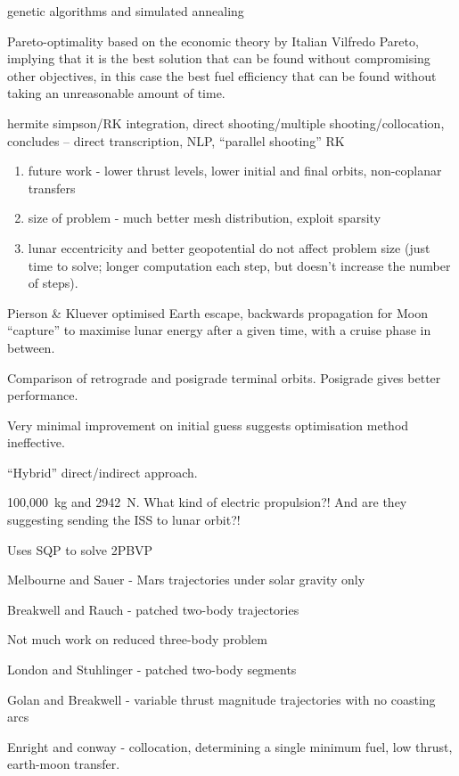 genetic algorithms and simulated annealing \textcite{Lee2005}

Pareto-optimality based on the economic theory by Italian Vilfredo Pareto, implying that it is the best solution that can be found without compromising other objectives, in this case the best fuel efficiency that can be found without taking an unreasonable amount of time. \parencite{Lee2005, Coverstone2000}

\textcite{Enright1992} hermite simpson/RK integration, direct shooting/multiple shooting/collocation, concludes -- direct transcription, NLP, \enquote{parallel shooting} RK
\begin{enumerate}
\item future work - lower thrust levels, lower initial and final orbits, non-coplanar transfers
\item size of problem - much better mesh distribution, exploit sparsity
\item lunar eccentricity and better geopotential do not affect problem size (just time to solve; longer computation each step, but doesn't increase the number of steps).
\end{enumerate}

Pierson \& Kluever optimised Earth escape, backwards propagation for Moon \enquote{capture} to maximise lunar energy after a given time, with a cruise phase in between.

Comparison of retrograde and posigrade terminal orbits. Posigrade gives better performance.

Very minimal improvement on initial guess suggests optimisation method ineffective.

\enquote{Hybrid} direct/indirect approach.

100,000~kg and 2942~N. What kind of electric propulsion?! And are they suggesting sending the ISS to lunar orbit?!

Uses SQP to solve 2PBVP

Melbourne and Sauer - Mars trajectories under solar gravity only

Breakwell and Rauch - patched two-body trajectories

Not much work on reduced three-body problem

London and Stuhlinger - patched two-body segments

Golan and Breakwell - variable thrust magnitude trajectories with no coasting arcs

Enright and conway - collocation, determining a single minimum fuel, low thrust, earth-moon transfer.

